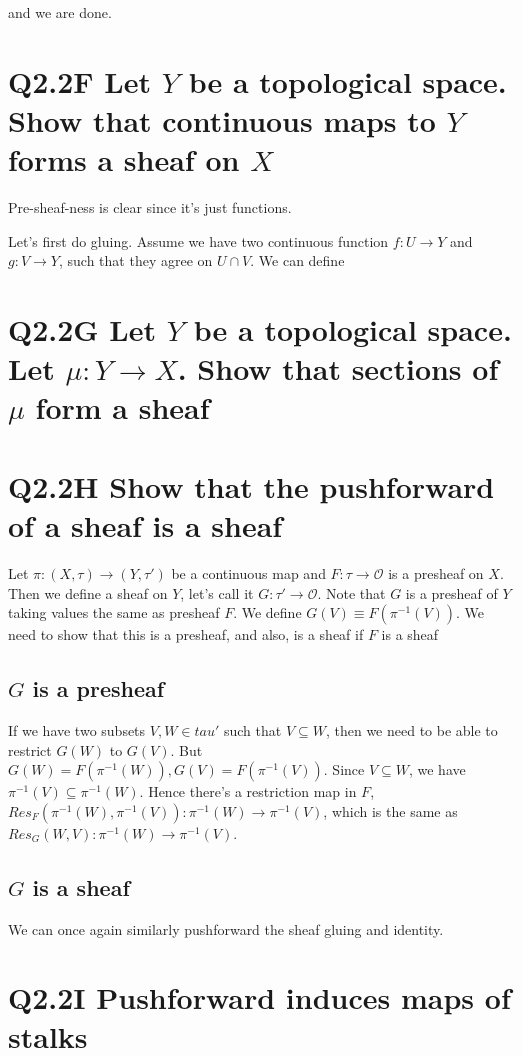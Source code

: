 \documentclass{book}
\renewcommand{\O}{\ensuremath{\mathcal{O}}}
\theoremstyle{definition}
\begin{document}
and we are done.

\section{Q2.2F Let $Y$ be a topological space. Show that continuous maps to $Y$ forms a sheaf on $X$}
Pre-sheaf-ness is clear since it's just functions.

Let's first do gluing. Assume we have two continuous function $f: U \rightarrow Y$ and $g: V \rightarrow Y$,
such that they agree on $U \cap V$. We can define 
\section{Q2.2G Let $Y$ be a topological space. Let $\mu: Y \rightarrow X$. Show that sections of $\mu$ form a sheaf}

\section{Q2.2H Show that the pushforward of a sheaf is a sheaf}

Let $\pi: (X, \tau) \rightarrow (Y, \tau')$ be a continuous map and $F : \tau \rightarrow \O$ is a presheaf on $X$.
Then we define a sheaf on $Y$, let's call it $G:\tau' \rightarrow \O$. Note that
$G$ is a presheaf of $Y$ taking values the same as presheaf $F$. We define
$G(V) \equiv F(\pi^{-1}(V))$. We need to show that this is a presheaf, and 
also, is a sheaf if $F$ is a sheaf

\subsection{$G$ is a presheaf}
If we have two subsets $V, W \in tau'$ such that $V \subseteq W$, then we need to be
able to restrict $G(W)$ to $G(V)$. But $G(W) = F(\pi^{-1}(W)), G(V) = F(\pi^{-1}(V))$.
Since $V \subseteq W$, we have $\pi^{-1}(V) \subseteq \pi^{-1}(W)$. Hence there's
a restriction map in $F$, $Res_F(\pi^{-1}(W), \pi^{-1}(V)): \pi^{-1}(W) \rightarrow \pi^{-1}(V)$,
which is the same as $Res_G(W, V): \pi^{-1}(W) \rightarrow \pi^{-1}(V)$.


\subsection{$G$ is a sheaf}
We can once again similarly pushforward the sheaf gluing and identity.

\section{Q2.2I Pushforward induces maps of stalks}
\end{document}
